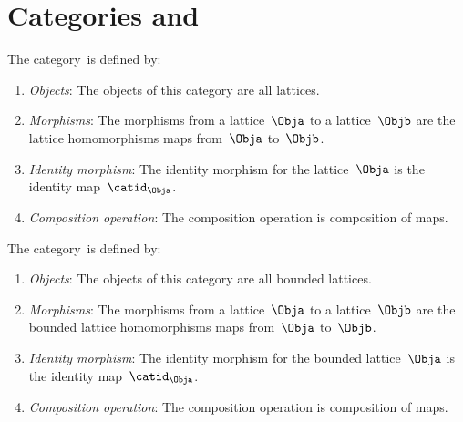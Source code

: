 \section{Categories \Lat and \BoundedLat}
\begin{ctdefinition}
    \label{def:Lat}
    The category~\Lat is defined by:
    \begin{enumerate}
        \item \emph{Objects}: The objects of this category are all lattices.
        \item \emph{Morphisms}: The morphisms from a lattice~$\Obja$ to a lattice~$\Objb$ are the lattice homomorphisms maps from~$\Obja$ to~$\Objb$.
        \item \emph{Identity morphism}: The identity morphism for the lattice~$\Obja$
              is the identity map~$\catid_\Obja$.
        \item \emph{Composition operation}: The composition operation is composition of maps.
    \end{enumerate}
\end{ctdefinition}

\begin{ctdefinition}
    \label{def:BoundedLat}
    The category~\BoundedLat is defined by:
    \begin{enumerate}
        \item \emph{Objects}: The objects of this category are all bounded lattices.
        \item \emph{Morphisms}: The morphisms from a lattice~$\Obja$ to a lattice~$\Objb$ are the bounded lattice homomorphisms maps from~$\Obja$ to~$\Objb$.
        \item \emph{Identity morphism}: The identity morphism for the bounded lattice~$\Obja$
              is the identity map~$\catid_\Obja$.
        \item \emph{Composition operation}: The composition operation is composition of maps.
    \end{enumerate}
\end{ctdefinition}

